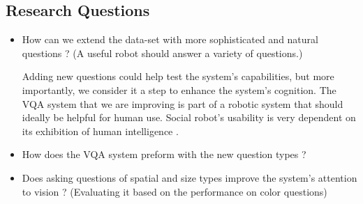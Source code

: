 \subsection{Research Questions}
\begin{itemize}


\item How can we extend the data-set with more sophisticated and natural questions ? (A useful robot should answer a variety of questions.)

Adding new questions could help test the system's capabilities, but more importantly, we consider it a step to enhance the system's cognition. The VQA system that we are improving is part of a robotic system that should ideally be helpful for human use. Social robot's usability is very dependent on its exhibition of human intelligence \cite{fong2003survey}.

\item How does the VQA system preform with the new question types ? 

\item Does asking questions of spatial and size types improve the system's attention to vision ? (Evaluating it based on the performance on color questions) 


\end{itemize}

 


